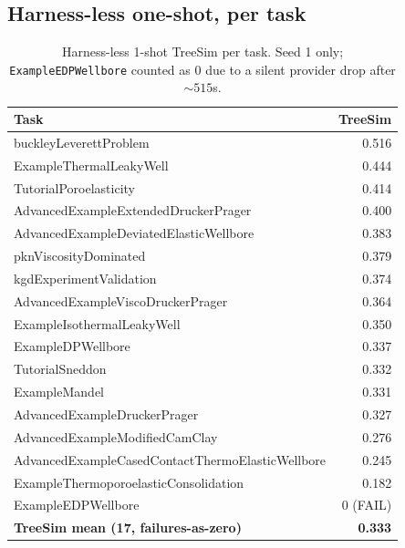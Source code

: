 \documentclass{article}
\begin{document}
\subsection{Harness-less one-shot, per task}
\begin{table}[h]
  \caption{Harness-less 1-shot TreeSim per task. Seed 1 only; \texttt{ExampleEDPWellbore} counted as 0 due to a silent provider drop after $\sim 515$s.}
  \label{tab:harnessless}
  \centering
  \small
  \begin{tabular}{lr}
    \toprule
    \textbf{Task} & \textbf{TreeSim} \\
    \midrule
    buckleyLeverettProblem                              & 0.516 \\
    ExampleThermalLeakyWell                             & 0.444 \\
    TutorialPoroelasticity                              & 0.414 \\
    AdvancedExampleExtendedDruckerPrager                & 0.400 \\
    AdvancedExampleDeviatedElasticWellbore              & 0.383 \\
    pknViscosityDominated                               & 0.379 \\
    kgdExperimentValidation                             & 0.374 \\
    AdvancedExampleViscoDruckerPrager                   & 0.364 \\
    ExampleIsothermalLeakyWell                          & 0.350 \\
    ExampleDPWellbore                                   & 0.337 \\
    TutorialSneddon                                     & 0.332 \\
    ExampleMandel                                       & 0.331 \\
    AdvancedExampleDruckerPrager                        & 0.327 \\
    AdvancedExampleModifiedCamClay                      & 0.276 \\
    AdvancedExampleCasedContactThermoElasticWellbore    & 0.245 \\
    ExampleThermoporoelasticConsolidation               & 0.182 \\
    ExampleEDPWellbore                                  & 0 (FAIL) \\
    \midrule
    \textbf{TreeSim mean (17, failures-as-zero)}        & \textbf{0.333} \\
    \bottomrule
  \end{tabular}
\end{table}
\end{document}
